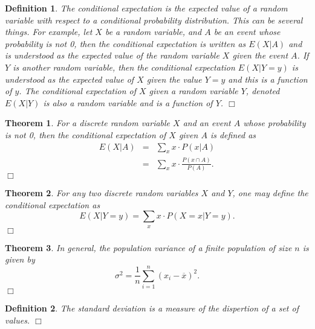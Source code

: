 \documentclass[11pt, letterpaper]{article}
\newenvironment{definition}
{\noindent\begin{defn}}
{\hfill $\Box$ \end{defn}}
\newtheorem{defn}{Definition}
\newenvironment{theorem}
{\noindent\begin{thm}}
{\hfill $\Box$ \end{thm}}
\newtheorem{thm}{Theorem}
\begin{document}
\begin{definition}
The \textit{conditional expectation} is the expected value of a random variable with respect to a conditional probability distribution.  This can be several things.  For example, let $X$ be a random variable, and $A$ be an event whose probability is not 0, then the conditional expectation is written as $E(X | A)$ and is understood as the expected value of the random variable $X$ given the event $A$.  If $Y$ is another random variable, then the conditional expectation $E(X|Y=y)$ is understood as the expected value of $X$ given the value $Y=y$ and this is a function of $y$.  The conditional expectation of $X$ given a random variable $Y$, denoted $E(X|Y)$ is also a random variable and is a function of $Y$.
\end{definition}

\begin{theorem}
For a discrete random variable $X$ and an event $A$ whose probability is not 0, then the \textit{conditional expectation} of $X$ given $A$ is defined as
\begin{eqnarray*}
	E(X|A) & = & \sum_x x \cdot P(x|A) \\
	& = & \sum_x x \cdot \frac{P(x \cap A)}{P(A)}.
\end{eqnarray*}
\end{theorem}



\begin{theorem}
For any two discrete random variables $X$ and $Y$, one may define the \textit{conditional expectation} as
\[
	E(X|Y = y) = \sum_x x \cdot P(X = x | Y = y).
\]
\end{theorem}


\begin{theorem}
In general, the population variance of a finite population of size $n$ is given by
\[
	\sigma^2 = \frac{1}{n} \sum_{i=1}^n (x_i - \overline{x})^2.
\]
\end{theorem}



\begin{definition}
The \textit{standard deviation} is a measure of the dispertion of a set of values.
\end{definition}
\end{document}
